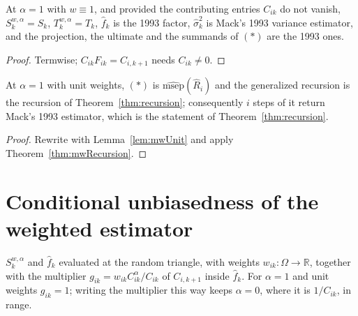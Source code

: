 \begin{lemma}[Unit weights, $\alpha = 1$]\label{lem:mwUnit}\leanok
{}
At $\alpha = 1$ with $w \equiv 1$, and provided the contributing entries $C_{ik}$ do not
vanish, $S_k^{w,\alpha} = S_k$, $T_k^{w,\alpha} = T_k$, $\hat f_k$ is the 1993 factor,
$\hat\sigma_k^2$ is Mack's 1993 variance estimator, and the projection, the ultimate and the
summands of $(*)$ are the 1993 ones.
\end{lemma}
\begin{proof}\leanok Termwise; $C_{ik} F_{ik} = C_{i,k+1}$ needs $C_{ik} \neq 0$. \end{proof}

\begin{theorem}\label{thm:mwUnit}\leanok
{}
At $\alpha = 1$ with unit weights, $(*)$ is $\widehat{\mathrm{msep}}(\hat R_i)$ and the
generalized recursion is the recursion of Theorem~\ref{thm:recursion}; consequently $i$ steps
of it return Mack's 1993 estimator, which is the statement of Theorem~\ref{thm:recursion}.
\end{theorem}
\begin{proof}\leanok Rewrite with Lemma~\ref{lem:mwUnit} and apply Theorem~\ref{thm:mwRecursion}. \end{proof}

\section{Conditional unbiasedness of the weighted estimator}

\begin{definition}\label{def:mwRv}\leanok
{}
$S_k^{w,\alpha}$ and $\hat f_k$ evaluated at the random triangle, with weights
$w_{ik} : \Omega \to \mathbb{R}$, together with the multiplier
$g_{ik} = w_{ik} C_{ik}^{\alpha}/C_{ik}$ of $C_{i,k+1}$ inside $\hat f_k$. For $\alpha = 1$
and unit weights $g_{ik} = 1$; writing the multiplier this way keeps $\alpha = 0$, where it
is $1/C_{ik}$, in range.
\end{definition}

